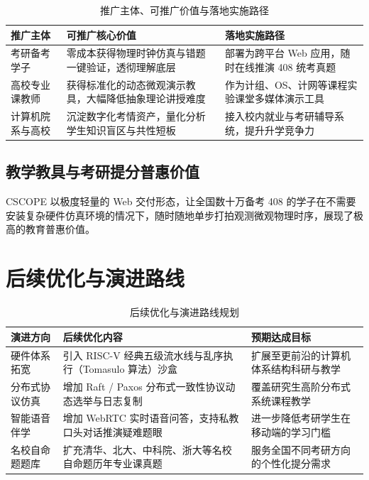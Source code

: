 \documentclass[UTF8,a4paper,11pt]{ctexart}
\begin{document}
\begin{table}[htbp]
\centering
\small
\caption{推广主体、可推广价值与落地实施路径}
\begin{tabularx}{\textwidth}{p{3cm}Xp{4.5cm}}
\toprule
\textbf{推广主体} & \textbf{可推广核心价值} & \textbf{落地实施路径} \\
\midrule
考研备考学子 & 零成本获得物理时钟仿真与错题一键验证，透彻理解底层 & 部署为跨平台 Web 应用，随时在线推演 408 统考真题 \\
高校专业课教师 & 获得标准化的动态微观演示教具，大幅降低抽象理论讲授难度 & 作为计组、OS、计网等课程实验课堂多媒体演示工具 \\
计算机院系与高校 & 沉淀数字化考情资产，量化分析学生知识盲区与共性短板 & 接入校内就业与考研辅导系统，提升升学竞争力 \\
\bottomrule
\end{tabularx}
\end{table}

\subsection{教学教具与考研提分普惠价值}
CSCOPE 以极度轻量的 Web 交付形态，让全国数十万备考 408 的学子在不需要安装复杂硬件仿真环境的情况下，随时随地单步打拍观测微观物理时序，展现了极高的教育普惠价值。

\section{后续优化与演进路线}

\begin{table}[htbp]
\centering
\small
\caption{后续优化与演进路线规划}
\begin{tabularx}{\textwidth}{p{3.2cm}Xp{4.2cm}}
\toprule
\textbf{演进方向} & \textbf{后续优化内容} & \textbf{预期达成目标} \\
\midrule
硬件体系拓宽 & 引入 RISC-V 经典五级流水线与乱序执行（Tomasulo 算法）沙盒 & 扩展至更前沿的计算机体系结构科研与教学 \\
分布式协议仿真 & 增加 Raft / Paxos 分布式一致性协议动态选举与日志复制 & 覆盖研究生高阶分布式系统课程教学 \\
智能语音伴学 & 增加 WebRTC 实时语音问答，支持私教口头对话推演疑难题眼 & 进一步降低考研学生在移动端的学习门槛 \\
名校自命题题库 & 扩充清华、北大、中科院、浙大等名校自命题历年专业课真题 & 服务全国不同考研方向的个性化提分需求 \\
\bottomrule
\end{tabularx}
\end{table}
\end{document}
